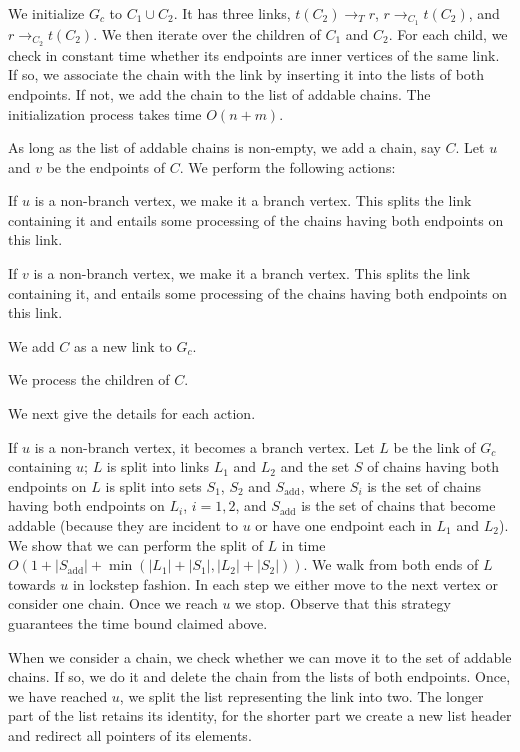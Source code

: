 \documentclass[paper=a4]{scrartcl}
\newcommand{\abs}[1]{| #1 |}
\begin{document}
We initialize $G_c$ to $C_1 \cup C_2$. It has three links, $t(C_2)\rightarrow_Tr$, $r\rightarrow _{C_1}t(C_2)$, and $r\rightarrow_{C_2} t(C_2)$. We then iterate over the children of $C_1$ and $C_2$. For each child, we check in constant time whether its endpoints are inner vertices of the same link. If so, we associate the chain with the link by inserting it into the lists of both endpoints. If not, we add the chain to the list of addable chains. The initialization process takes time $O(n + m)$.

As long as the list of addable chains is non-empty, we add a chain, say $C$. Let $u$ and $v$ be the endpoints of $C$. We perform the following actions:
\begin{compactitem}
\item If $u$ is a non-branch vertex, we make it a branch vertex. This splits the link containing it and entails some processing of the chains having both endpoints on this link.
\item If $v$ is a non-branch vertex, we make it a branch vertex. This splits the link containing it, and entails some processing of the chains having both endpoints on this link.
\item We add $C$ as a new link to $G_c$.
\item We process the children of $C$.
\end{compactitem}
We next give the details for each action.

If $u$ is a non-branch vertex, it becomes a branch vertex. Let $L$ be the link of $G_c$ containing $u$; $L$ is split into links $L_1$ and $L_2$ and the set $S$ of chains having both endpoints on $L$ is split into sets $S_1$, $S_2$ and $S_{\text{add}}$, where $S_i$ is the set of chains having both endpoints on $L_i$, $i = 1,2$, and $S_{\text{add}}$ is the set of chains that become addable (because they are incident to $u$ or have one endpoint each in $L_1$ and $L_2$). We show that we can perform the split of $L$ in time $O(1 + \abs{S_{\text{add}}} + \min(\abs{L_1} + \abs{S_1},\abs{L_2} + \abs{S_2}))$. We walk from both ends of $L$ towards $u$ in lockstep fashion. In each step we either move to the next vertex or consider one chain. Once we reach $u$ we stop. Observe that this strategy guarantees the time bound claimed above.

When we consider a chain, we check whether we can move it to the set of addable chains. If so, we do it and delete the chain from the lists of both endpoints. Once, we have reached $u$, we split the list representing the link into two. The longer part of the list retains its identity, for the shorter part we create a new list header and redirect all pointers of its elements.
\end{document}
